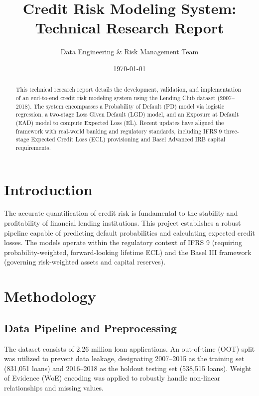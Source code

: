 \documentclass[12pt,a4paper]{article}
\title{Credit Risk Modeling System: \\ Technical Research Report}
\author{Data Engineering \& Risk Management Team}
\date{\today}
\begin{document}
\maketitle

\begin{abstract}
This technical research report details the development, validation, and implementation of an end-to-end credit risk modeling system using the Lending Club dataset (2007--2018). The system encompasses a Probability of Default (PD) model via logistic regression, a two-stage Loss Given Default (LGD) model, and an Exposure at Default (EAD) model to compute Expected Loss (EL). Recent updates have aligned the framework with real-world banking and regulatory standards, including IFRS 9 three-stage Expected Credit Loss (ECL) provisioning and Basel Advanced IRB capital requirements. 
\end{abstract}

\section{Introduction}
The accurate quantification of credit risk is fundamental to the stability and profitability of financial lending institutions. This project establishes a robust pipeline capable of predicting default probabilities and calculating expected credit losses. The models operate within the regulatory context of IFRS 9 (requiring probability-weighted, forward-looking lifetime ECL) and the Basel III framework (governing risk-weighted assets and capital reserves). 

\section{Methodology}
\subsection{Data Pipeline and Preprocessing}
The dataset consists of 2.26 million loan applications. An out-of-time (OOT) split was utilized to prevent data leakage, designating 2007--2015 as the training set (831,051 loans) and 2016--2018 as the holdout testing set (538,515 loans). Weight of Evidence (WoE) encoding was applied to robustly handle non-linear relationships and missing values.
\end{document}
